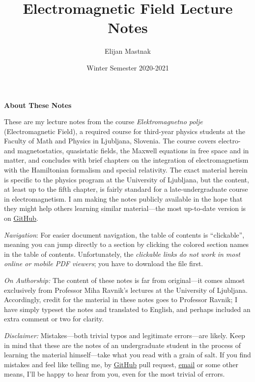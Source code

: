 \documentclass[11pt, a4paper]{article}
\begin{document}
\title{Electromagnetic Field Lecture Notes}
\author{Elijan Mastnak}
\date{Winter Semester 2020-2021}
\maketitle

\thispagestyle{empty}  %

\begin{center}
    \textbf{About These Notes}
\end{center}

These are my lecture notes from the course \textit{Elektromagnetno polje} (Electromagnetic Field), a required course for third-year physics students at the Faculty of Math and Physics in Ljubljana, Slovenia. The course covers electro- and magnetostatics, quasistatic fields, the Maxwell equations in free space and in matter, and concludes with brief chapters on the integration of electromagnetism with the Hamiltonian formalism and special relativity. The exact material herein is specific to the physics program at the University of Ljubljana, but the content, at least up to the fifth chapter, is fairly standard for a late-undergraduate course in electromagnetism. I am making the notes publicly available in the hope that they might help others learning similar material---the most up-to-date version is on \href{https://github.com/ejmastnak/fmf/tree/main/electromagnetic-field}{\underline{GitHub}}.

\vspace{2mm}
\textit{Navigation}: For easier document navigation, the table of contents is ``clickable'', meaning you can jump directly to a section by clicking the colored section names in the table of contents. Unfortunately, the \textit{clickable links do not work in most online or mobile PDF viewers}; you have to download the file first.

\vspace{2mm}
\textit{On Authorship:} The content of these notes is far from original---it comes almost exclusively from Professor Miha Ravnik's lectures at the University of Ljubljana. Accordingly, credit for the material in these notes goes to Professor Ravnik; I have simply typeset the notes and translated to English, and perhaps included an extra comment or two for clarity.

\vspace{2mm}
\textit{Disclaimer:} Mistakes---both trivial typos and legitimate errors---are likely. Keep in mind that these are the notes of an undergraduate student in the process of learning the material himself---take what you read with a grain of salt. If you find mistakes and feel like telling me, by \href{https://github.com/ejmastnak/fmf}{\underline{GitHub}} pull request, \href{mailto:ejmastnak@gmail.com}{\underline{email}} or some other means, I'll be happy to hear from you, even for the most trivial of errors.
\end{document}
